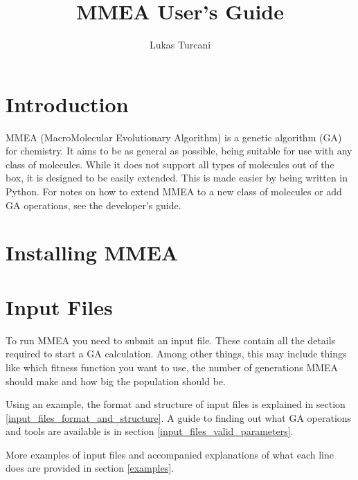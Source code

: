 \documentclass{article}
\title{MMEA User's Guide}
\author{Lukas Turcani}
\begin{document}
\begin{titlepage}
	\maketitle
\end{titlepage}

\tableofcontents
\newpage
\section{Introduction}
MMEA (MacroMolecular Evolutionary Algorithm) is a genetic algorithm (GA) for chemistry. It aims to be as general as possible, being suitable for use with any class of molecules. While it does not support all types of molecules out of the box, it is designed to be easily extended. This is made easier by being written in Python. For notes on how to extend MMEA to a new class of molecules or add GA operations, see the developer's guide.

\section{Installing MMEA}

\section{Input Files}
To run MMEA you need to submit an input file. These contain all the details required to start a GA calculation. Among other things, this may include things like which fitness function you want to use, the number of generations MMEA should make and how big the population should be.

Using an example, the format and structure of input files is explained in section \ref{input_files_format_and_structure}. A guide to finding out what GA operations and tools are available is in section \ref{input_files_valid_parameters}.

More examples of input files and accompanied explanations of what each line does are provided in section \ref{examples}.
\end{document}
